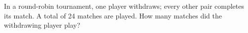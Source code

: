 In a round-robin tournament, one player withdraws; every other pair completes its match. A total of 24 matches are played. How many matches did the withdrawing player play?
